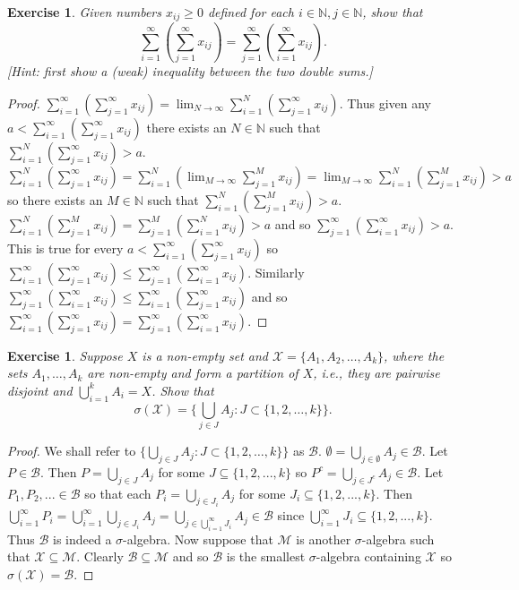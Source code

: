 \documentclass{article}
\newtheorem{exercise}[theorem]{Exercise}
\begin{document}
\begin{exercise}
    Given numbers $x_{ij} \geq 0$ defined for each $i \in \mathbb{N}, j \in \mathbb{N}$, show that 
    \[
    \sum_{i=1}^{\infty} \left(\sum_{j=1}^{\infty} x_{ij}\right) = \sum_{j=1}^{\infty} \left(\sum_{i=1}^{\infty} x_{ij}\right).
    \]
    [\textit{Hint: first show a (weak) inequality between the two double sums.}]
\end{exercise}
\begin{proof}
$\sum_{i=1}^{\infty} \left(\sum_{j=1}^{\infty} x_{ij}\right)=\lim_{N\to\infty}\sum_{i=1}^N(\sum_{j=1}^\infty x_{ij})$. Thus given any $a<\sum_{i=1}^{\infty} \left(\sum_{j=1}^{\infty} x_{ij}\right)$ there exists an $N\in\mathbb{N}$ such that $\sum_{i=1}^N(\sum_{j=1}^\infty x_{ij})>a$. $\sum_{i=1}^N(\sum_{j=1}^\infty x_{ij})=\sum_{i=1}^N(\lim_{M\to\infty}\sum_{j=1}^M x_{ij})=\lim_{M\to\infty}\sum_{i=1}^N(\sum_{j=1}^M x_{ij})>a$ so there exists an $M\in\mathbb{N}$ such that $\sum_{i=1}^N(\sum_{j=1}^M x_{ij})>a$. $\sum_{i=1}^N(\sum_{j=1}^M x_{ij})=\sum_{j=1}^M(\sum_{i=1}^N x_{ij})>a$ and so $\sum_{j=1}^\infty(\sum_{i=1}^\infty x_{ij})> a$. This is true for every $a<\sum_{i=1}^{\infty} \left(\sum_{j=1}^{\infty} x_{ij}\right)$ so $\sum_{i=1}^{\infty} \left(\sum_{j=1}^{\infty} x_{ij}\right)\leq\sum_{j=1}^\infty(\sum_{i=1}^\infty x_{ij})$. Similarly $\sum_{j=1}^\infty(\sum_{i=1}^\infty x_{ij})\leq \sum_{i=1}^{\infty} \left(\sum_{j=1}^{\infty} x_{ij}\right)$ and so $\sum_{i=1}^{\infty} \left(\sum_{j=1}^{\infty} x_{ij}\right) = \sum_{j=1}^{\infty} \left(\sum_{i=1}^{\infty} x_{ij}\right)$.
\end{proof}
\begin{exercise}
    Suppose $X$ is a non-empty set and $\mathcal{X} = \{A_1, A_2, \ldots, A_k\}$, where the sets $A_1, \ldots, A_k$ are non-empty and form a partition of $X$, i.e., they are pairwise disjoint and $\bigcup_{i=1}^{k} A_i = X$. Show that 
    \[
    \sigma(\mathcal{X}) = \{\bigcup_{j \in J} A_j : J \subset \{1, 2, \ldots, k\}\}.
    \]
\end{exercise}
\begin{proof}
We shall refer to $\{\bigcup_{j \in J} A_j : J \subset \{1, 2, \ldots, k\}\}$ as $\mathcal{B}$. $\emptyset=\bigcup_{j\in\emptyset}A_j\in\mathcal{B}$. Let $P\in\mathcal{B}$. Then $P=\bigcup_{j\in J}A_j$ for some $J\subseteq\{1,2,...,k\}$ so $P^c=\bigcup_{j\in J^c}A_j\in\mathcal{B}$. Let $P_1,P_2,...\in\mathcal{B}$ so that each $P_i=\bigcup_{j\in J_i}A_j$ for some $J_i\subseteq\{1,2,...,k\}$. Then $\bigcup_{i=1}^\infty P_i=\bigcup_{i=1}^\infty\bigcup_{j\in J_i}A_j=\bigcup_{j\in\bigcup_{i=1}^\infty J_i}A_j\in\mathcal{B}$ since $\bigcup_{i=1}^\infty J_i\subseteq\{1,2,...,k\}$. Thus $\mathcal{B}$ is indeed a $\sigma$-algebra. Now suppose that $\mathcal{M}$ is another $\sigma$-algebra such that $\mathcal{X}\subseteq\mathcal{M}$. Clearly $\mathcal{B}\subseteq\mathcal{M}$ and so $\mathcal{B}$ is the smallest $\sigma$-algebra containing $\mathcal{X}$ so $\sigma(\mathcal{X})=\mathcal{B}$.
\end{proof}
\end{document}

